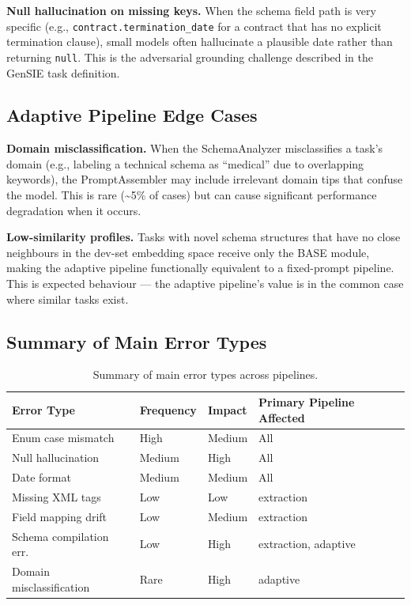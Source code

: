 \documentclass{ceurart}
\begin{document}
\textbf{Null hallucination on missing keys.}
When the schema field path is very specific (e.g., \texttt{contract.termination\_date}
for a contract that has no explicit termination clause), small models often hallucinate
a plausible date rather than returning \texttt{null}.
This is the adversarial grounding challenge described in the GenSIE task definition.

\subsection{Adaptive Pipeline Edge Cases}

\textbf{Domain misclassification.}
When the SchemaAnalyzer misclassifies a task's domain (e.g., labeling a technical
schema as ``medical'' due to overlapping keywords), the PromptAssembler may include
irrelevant domain tips that confuse the model.
This is rare ({\textasciitilde}5\% of cases) but can cause significant performance
degradation when it occurs.

\textbf{Low-similarity profiles.}
Tasks with novel schema structures that have no close neighbours in the dev-set
embedding space receive only the BASE module, making the adaptive pipeline functionally
equivalent to a fixed-prompt pipeline.
This is expected behaviour --- the adaptive pipeline's value is in the common case
where similar tasks exist.

\subsection{Summary of Main Error Types}

\begin{table}
  \caption{Summary of main error types across pipelines.}
  \label{tab:errors}
  \centering
  \begin{tabular}{llll}
    \toprule
    Error Type & Frequency & Impact & Primary Pipeline Affected \\
    \midrule
    Enum case mismatch     & High   & Medium & All \\
    Null hallucination     & Medium & High   & All \\
    Date format            & Medium & Medium & All \\
    Missing XML tags       & Low    & Low    & extraction \\
    Field mapping drift    & Low    & Medium & extraction \\
    Schema compilation err.& Low    & High   & extraction, adaptive \\
    Domain misclassification & Rare & High  & adaptive \\
    \bottomrule
  \end{tabular}
\end{table}
\end{document}
